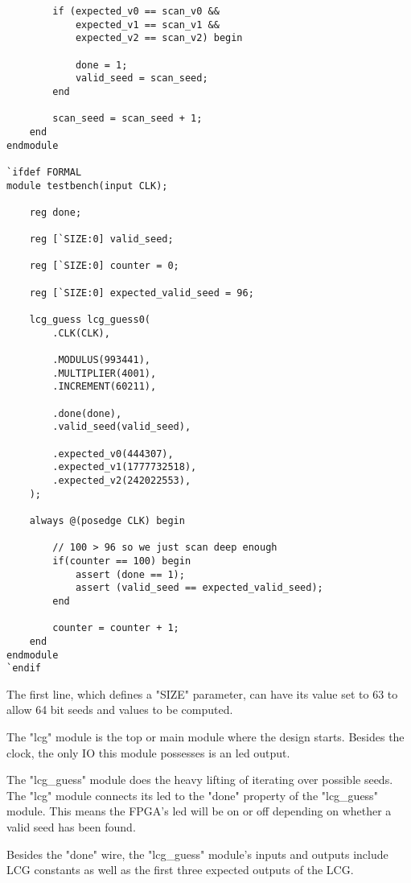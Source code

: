 \documentclass{article}
\begin{document}
\begin{lstlisting}
        if (expected_v0 == scan_v0 &&
            expected_v1 == scan_v1 &&
            expected_v2 == scan_v2) begin
            
            done = 1;
            valid_seed = scan_seed;
        end
        
        scan_seed = scan_seed + 1;
    end
endmodule

`ifdef FORMAL
module testbench(input CLK);
    
    reg done;
    
    reg [`SIZE:0] valid_seed;
    
    reg [`SIZE:0] counter = 0;
    
    reg [`SIZE:0] expected_valid_seed = 96;
    
    lcg_guess lcg_guess0(
        .CLK(CLK),
        
        .MODULUS(993441),
        .MULTIPLIER(4001),
        .INCREMENT(60211),
        
        .done(done),
        .valid_seed(valid_seed),
        
        .expected_v0(444307),
        .expected_v1(1777732518),
        .expected_v2(242022553),
    );
    
    always @(posedge CLK) begin
        
        // 100 > 96 so we just scan deep enough
        if(counter == 100) begin
            assert (done == 1); 
            assert (valid_seed == expected_valid_seed); 
        end
        
        counter = counter + 1;
    end
endmodule
`endif

    \end{lstlisting}

    The first line, which defines a "SIZE" parameter, can
    have its value set to 63 to allow 64 bit seeds and values
    to be computed.

    The "lcg" module is the top or main module where the design starts.
    Besides the clock, the only IO this module possesses is an led output.

    The "lcg\_guess" module does the heavy lifting of iterating over possible
    seeds. The "lcg" module connects its led to the "done" property of
    the "lcg\_guess" module. This means the FPGA's led will be on or off
    depending on whether a valid seed has been found.

    Besides the "done" wire, the "lcg\_guess" module's inputs and outputs include
    LCG constants as well as the first three expected outputs of the LCG.
\end{document}
